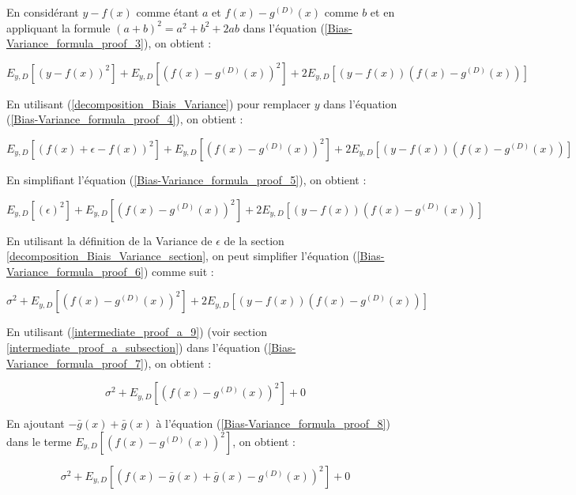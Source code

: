 \documentclass[a4paper]{article}
\begin{document}
En considérant $ y - f(x) $ comme étant $a$ et $ f(x) - g^{(D)}(x)$ comme $b$ et en appliquant la formule $(a+b)^2 = a^2 + b^2 + 2ab$ dans l'équation (\ref{Bias-Variance_formula_proof_3}), on obtient :

\begin{equation}
\label{Bias-Variance_formula_proof_4}
E_{y,D} [(y-f(x))^2] + E_{y,D} [(f(x) - g^{(D)}(x))^2] + 2E_{y,D} [(y-f(x)) (f(x) - g^{(D)}(x)) ]
\end{equation}

En utilisant (\ref{decomposition_Biais_Variance}) pour remplacer $y$ dans l'équation (\ref{Bias-Variance_formula_proof_4}), on obtient :

\begin{equation}
\label{Bias-Variance_formula_proof_5}
E_{y,D} [(f(x) + \epsilon - f(x))^2] + E_{y,D} [(f(x) - g^{(D)}(x))^2] + 2E_{y,D} [(y-f(x)) (f(x) - g^{(D)}(x)) ]
\end{equation}

En simplifiant l'équation (\ref{Bias-Variance_formula_proof_5}), on obtient :

\begin{equation}
\label{Bias-Variance_formula_proof_6}
E_{y,D} [(\epsilon)^2] + E_{y,D} [(f(x) - g^{(D)}(x))^2] + 2E_{y,D} [(y-f(x)) (f(x) - g^{(D)}(x)) ]
\end{equation}

En utilisant la définition de la Variance de $\epsilon$ de la section \ref{decomposition_Biais_Variance_section}, on peut simplifier l'équation (\ref{Bias-Variance_formula_proof_6}) comme suit :

\begin{equation}
\label{Bias-Variance_formula_proof_7}
\sigma^2 + E_{y,D} [(f(x) - g^{(D)}(x))^2] + 2E_{y,D} [(y-f(x)) (f(x) - g^{(D)}(x)) ]
\end{equation}

En utilisant (\ref{intermediate_proof_a_9}) (voir section \ref{intermediate_proof_a_subsection}) dans l'équation (\ref{Bias-Variance_formula_proof_7}), on obtient :

\begin{equation}
	\label{Bias-Variance_formula_proof_8}
\sigma^2 + E_{y,D} [(f(x) - g^{(D)}(x))^2] + 0
\end{equation}

En ajoutant $ -\bar{g}(x) + \bar{g}(x)$ à l'équation (\ref{Bias-Variance_formula_proof_8}) dans le terme $ E_{y,D} [(f(x) - g^{(D)}(x))^2]$, on obtient :

\begin{equation}
	\label{Bias-Variance_formula_proof_9}
	\sigma^2 + E_{y,D} [(f(x) -\bar{g}(x) + \bar{g}(x) - g^{(D)}(x))^2] + 0
\end{equation}
\end{document}
